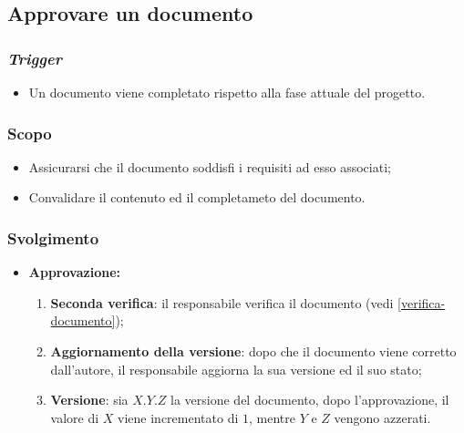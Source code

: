 \subsection{Approvare un documento}
\label{approvazione-documento}

\subsubsection{\textit{Trigger}}
\begin{itemize}
	\item Un documento viene completato rispetto alla fase attuale del progetto.
\end{itemize}

\subsubsection{Scopo}
\begin{itemize}
	\item Assicurarsi che il documento soddisfi i requisiti ad esso associati;

	\item Convalidare il contenuto ed il completameto del documento.
\end{itemize}

\subsubsection{Svolgimento}
\begin{itemize}
	\item \textbf{Approvazione:}
	      \begin{enumerate}
		      \item \textbf{Seconda verifica}: il responsabile verifica il
		            documento (vedi \autoref{verifica-documento});

		      \item \textbf{Aggiornamento della versione}: dopo che il documento
		            viene corretto dall'autore, il responsabile aggiorna la
		            sua versione ed il suo stato;

		      \item \textbf{Versione}: sia $X.Y.Z$ la versione del documento,
		            dopo l'approvazione, il valore di $X$ viene incrementato di
		            $1$, mentre $Y$ e $Z$ vengono azzerati.
	      \end{enumerate}
\end{itemize}
